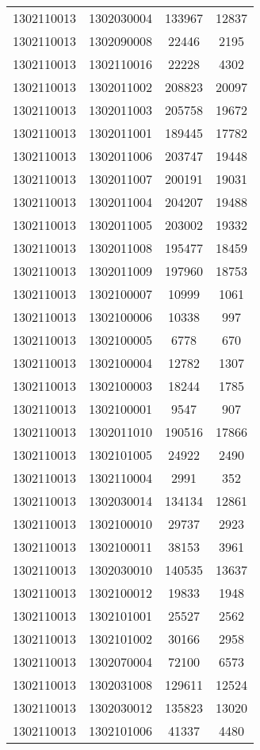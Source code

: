 \begin{longtable}[h]{llcc}
		1302110013 & 1302030004 & 133967 & 12837\\
		1302110013 & 1302090008 & 22446 & 2195\\
		1302110013 & 1302110016 & 22228 & 4302\\
		1302110013 & 1302011002 & 208823 & 20097\\
		1302110013 & 1302011003 & 205758 & 19672\\
		1302110013 & 1302011001 & 189445 & 17782\\
		1302110013 & 1302011006 & 203747 & 19448\\
		1302110013 & 1302011007 & 200191 & 19031\\
		1302110013 & 1302011004 & 204207 & 19488\\
		1302110013 & 1302011005 & 203002 & 19332\\
		1302110013 & 1302011008 & 195477 & 18459\\
		1302110013 & 1302011009 & 197960 & 18753\\
		1302110013 & 1302100007 & 10999 & 1061\\
		1302110013 & 1302100006 & 10338 & 997\\
		1302110013 & 1302100005 & 6778 & 670\\
		1302110013 & 1302100004 & 12782 & 1307\\
		1302110013 & 1302100003 & 18244 & 1785\\
		1302110013 & 1302100001 & 9547 & 907\\
		1302110013 & 1302011010 & 190516 & 17866\\
		1302110013 & 1302101005 & 24922 & 2490\\
		1302110013 & 1302110004 & 2991 & 352\\
		1302110013 & 1302030014 & 134134 & 12861\\
		1302110013 & 1302100010 & 29737 & 2923\\
		1302110013 & 1302100011 & 38153 & 3961\\
		1302110013 & 1302030010 & 140535 & 13637\\
		1302110013 & 1302100012 & 19833 & 1948\\
		1302110013 & 1302101001 & 25527 & 2562\\
		1302110013 & 1302101002 & 30166 & 2958\\
		1302110013 & 1302070004 & 72100 & 6573\\
		1302110013 & 1302031008 & 129611 & 12524\\
		1302110013 & 1302030012 & 135823 & 13020\\
		1302110013 & 1302101006 & 41337 & 4480\\

\end{longtable}
